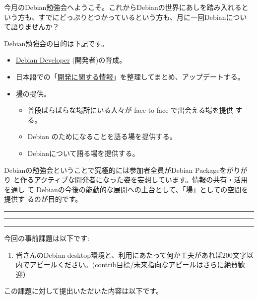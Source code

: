 \documentclass[mingoth,a4paper]{jsarticle}
\begin{document}
\begin{multicols}{2}
 

 今月のDebian勉強会へようこそ。これからDebianの世界にあしを踏み入れると
 いう方も、すでにどっぷりとつかっているという方も、月に一回Debianについ
 て語りませんか？

 Debian勉強会の目的は下記です。

 \begin{itemize}
 \item \underline{Debian Developer} (開発者)の育成。
 \item 日本語での「\underline{開発に関する情報}」を整理してまとめ、アップデートする。
 \item \underline{場}の提供。
 \begin{itemize}
  \item 普段ばらばらな場所にいる人々が face-to-face で出会える場を提供
	する。
  \item Debian のためになることを語る場を提供する。
  \item Debianについて語る場を提供する。
 \end{itemize}
 \end{itemize}		

 Debianの勉強会ということで究極的には参加者全員がDebian Packageをがりがり
 と作るアクティブな開発者になった姿を妄想しています。情報の共有・活用を通し
 て Debianの今後の能動的な展開への土台として、「場」としての空間を提供す
 るのが目的です。

\end{multicols}

\newpage

\begin{minipage}[b]{0.2\hsize}
 \colorbox{titleback}{}
\end{minipage}
\begin{minipage}[b]{0.8\hsize}
\hrule
\vspace{2mm}
\hrule
\begin{multicols}{2}
\tableofcontents
\end{multicols}
\vspace{2mm}
\hrule
\end{minipage}


今回の事前課題は以下です:
\begin{enumerate}
 \item 皆さんのDebian desktop環境と、利用にあたって何か工夫があれば200文字以内でアピールください。(contrib目標/未来指向なアピールはさらに絶賛歓迎）
\end{enumerate}
この課題に対して提出いただいた内容は以下です。
\begin{multicols}{2}
{\small

}
\end{multicols}
\end{document}
